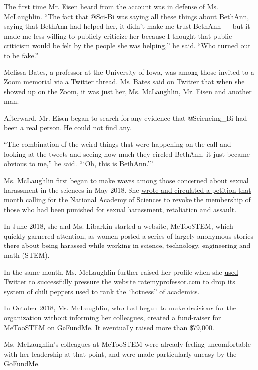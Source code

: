 The first time Mr. Eisen heard from the account was in defense of Ms.
McLaughlin. ``The fact that @Sci-Bi was saying all these things about
BethAnn, saying that BethAnn had helped her, it didn't make me trust
BethAnn --- but it made me less willing to publicly criticize her
because I thought that public criticism would be felt by the people she
was helping,'' he said. ``Who turned out to be fake.''

Melissa Bates, a professor at the University of Iowa, was among those
invited to a Zoom memorial via a Twitter thread. Ms. Bates said on
Twitter that when she showed up on the Zoom, it was just her, Ms.
McLaughlin, Mr. Eisen and another man.

Afterward, Mr. Eisen began to search for any evidence that
@Sciencing\_Bi had been a real person. He could not find any.

``The combination of the weird things that were happening on the call
and looking at the tweets and seeing how much they circled BethAnn, it
just became obvious to me,'' he said. ```Oh, this is BethAnn.'''

Ms. McLaughlin first began to make waves among those concerned about
sexual harassment in the sciences in May 2018. She
\href{https://www.change.org/p/national-academy-of-sciences-remove-sexual-harassers-from-national-academy-of-sciences}{wrote
and circulated a petition that month} calling for the National Academy
of Sciences to revoke the membership of those who had been punished for
sexual harassment, retaliation and assault.

In June 2018, she and Ms. Libarkin started a website, MeTooSTEM, which
quickly garnered attention, as women posted a series of largely
anonymous stories there about being harassed while working in science,
technology, engineering and math (STEM).

In the same month, Ms. McLaughlin further raised her profile when she
\href{https://www.buzzfeednews.com/article/juliareinstein/rate-my-professors-hotness-chili-pepper-sexist?bfsource=relatedmanual}{used
Twitter} to successfully pressure the website ratemyprofessor.com to
drop its system of chili peppers used to rank the ``hotness'' of
academics.

In October 2018, Ms. McLaughlin, who had begun to make decisions for the
organization without informing her colleagues, created a fund-raiser for
MeTooSTEM on GoFundMe. It eventually raised more than \$79,000.

Ms. McLaughlin's colleagues at MeTooSTEM were already feeling
uncomfortable with her leadership at that point, and were made
particularly uneasy by the GoFundMe.

